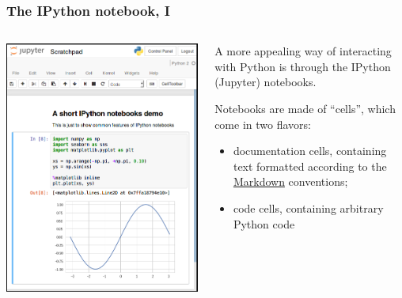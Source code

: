 \documentclass[english,serif,mathserif,xcolor=pdftex,dvipsnames,table]{beamer}
\begin{document}
\begin{frame}
  \frametitle{The IPython notebook, I}

  \begin{columns}[t]
    \begin{column}{0.5\textwidth}
      \begin{center}
        \includegraphics[width=1.00\linewidth]{fig/nb.png}
      \end{center}
    \end{column}
    \begin{column}{0.5\textwidth}
      \small

      A more appealing way of interacting with Python is through the IPython (Jupyter)
      notebooks.

      \+
      Notebooks are made of ``cells'', which come in two flavors:
      \begin{itemize}
      \item documentation cells, containing text formatted according to the
        \href{http://commonmark.org/help/}{Markdown} conventions;
      \item code cells, containing arbitrary Python code
      \end{itemize}
    \end{column}
  \end{columns}
\end{frame}
\end{document}
